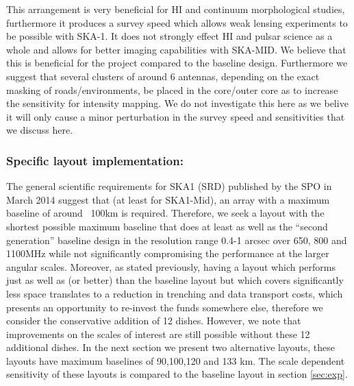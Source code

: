 \documentclass[sfheadings,a4paper,times,9pt,floats,floatfix]{article}
\begin{document}
This arrangement is very beneficial for HI and continuum morphological studies,
furthermore it produces a survey speed which allows weak lensing experiments to be
possible with SKA-1. It does not strongly effect HI and pulsar science as a whole and allows for
better imaging capabilities with SKA-MID. We believe that this is beneficial for the project
compared to the baseline design. Furthermore we suggest that several clusters of around 6
antennas, depending on the exact masking of roads/environments, be placed in the core/outer
core as to increase the sensitivity for intensity mapping. We do not
investigate this here as we belive it will only cause a minor perturbation in
the survey speed and sensitivities that we discuss here.

\subsubsection{Specific layout implementation:}
The general scientific requirements for SKA1\cite{srd} (SRD) published by the SPO in March 2014 suggest that (at least for
SKA1-Mid), an array with a maximum baseline of around ~100km is required. Therefore, we seek a layout with the shortest possible
maximum baseline that does at least as well as the ``second generation'' baseline design in the resolution range 0.4-1 arcsec over
650, 800 and 1100MHz while not significantly compromising the performance at the larger angular scales. Moreover, as stated
previously, having a layout which performs just as well as (or better) than the baseline layout but which covers significantly
less space translates to a reduction in trenching and data transport costs, which presents an opportunity to re-invest the funds
somewhere else, therefore we consider the conservative addition of 12 dishes. However, we note that improvements on the scales of
interest are still possible without these 12 additional dishes. In the next section we present two alternative layouts, these
layouts
have maximum baselines of 90,100,120 and 133 km. The scale dependent sensitivity of these layouts is compared to the baseline
layout in section \ref{sec:exp}.
\end{document}
